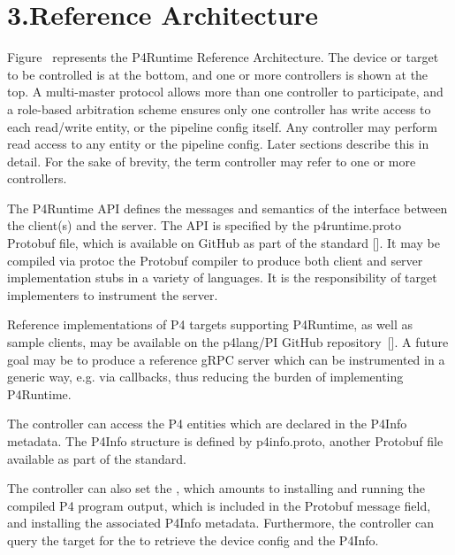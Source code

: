 \documentclass[11pt]{article}
\begin{document}
{%
\section{3.\hspace*{0.5em}Reference Architecture}\label{sec-reference-architecture}%

\noindent{}Figure~ represents the P4Runtime Reference
Architecture. The device or target to be controlled is at the bottom, and one or
more controllers is shown at the top. A multi-master protocol allows more than
one controller to participate, and a role-based arbitration scheme ensures only
one controller has write access to each read/write entity, or the pipeline
config itself. Any controller may perform read access to any entity or the
pipeline config. Later sections describe this in detail. For the sake of
brevity, the term controller may refer to one or more controllers.%

The P4Runtime API defines the messages and semantics of the interface between
the client(s) and the server. The API is specified by the p4runtime.proto
Protobuf file, which is available on GitHub as part of the standard
[].  It may be compiled via protoc \textemdash{} the Protobuf compiler \textemdash{}
to produce both client and server implementation stubs in a variety of
languages. It is the responsibility of target implementers to instrument the
server.%

Reference implementations of P4 targets supporting P4Runtime, as well as sample
clients, may be available on the p4lang/PI GitHub repository~[]. A future
goal may be to produce a reference gRPC server which can be instrumented in a
generic way, e.g. via callbacks, thus reducing the burden of implementing
P4Runtime.%

The controller can access the P4 entities which are declared in the P4Info
metadata. The P4Info structure is defined by p4info.proto, another Protobuf file
available as part of the standard.%

The controller can also set the , which amounts to
installing and running the compiled P4 program output, which is included in the
 Protobuf message field, and installing the associated P4Info
metadata. Furthermore, the controller can query the target for the
 to retrieve the device config and the P4Info.%

}
\end{document}
